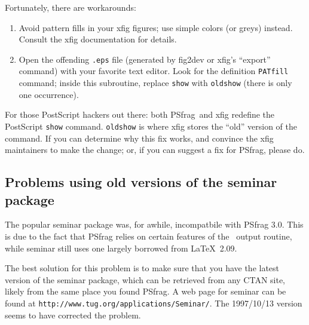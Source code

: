 \documentclass[11pt]{ltxguide}
\let\pkg\textsf
\let\fname\texttt
\let\pscom\texttt
\newcommand{\pfg}{\pkg{PSfrag}}
\begin{document}
Fortunately, there are workarounds:
\begin{enumerate}
	\item Avoid pattern fills in your \pkg{xfig} figures; use simple
		  colors (or greys) instead. Consult the \pkg{xfig} documentation
		  for details.
	\item Open the offending \fname{.eps} file (generated by \pkg{fig2dev}
		  or \pkg{xfig}'s ``export'' command) with your favorite text editor.
		  Look for the definition \pscom{PATfill} command; inside this 
		  subroutine, replace \pscom{show} with \pscom{oldshow} (there is only
		  one occurrence).
\end{enumerate}
For those PostScript hackers out there: both \pfg\ and \pkg{xfig} redefine the
PostScript \pscom{show} command. \pscom{oldshow} is where \pkg{xfig} stores the
``old'' version of the command. If you can determine why this fix works, and
convince the \pkg{xfig} maintainers to make the change; or, if you can suggest
a fix for \pfg, please do.

\subsection{Problems using old versions of the \pkg{seminar} package}
\label{sec:sem-bug}

The popular \pkg{seminar} package was, for awhile, incompatbile with PSfrag
3.0. This is due to the fact that PSfrag relies on certain features of the
\LaTeXe\ output routine, while \pkg{seminar} still uses one largely borrowed
from \LaTeX\ 2.09.

The best solution for this problem is to make sure that you have the latest
version of the \pkg{seminar} package, which can be retrieved from any CTAN
site, likely from the same place you found \pfg. A web page for \pkg{seminar}
can be found at \fname{http://www.tug.org/applications/Seminar/}. The
1997/10/13 version seems to have corrected the problem.
\end{document}

